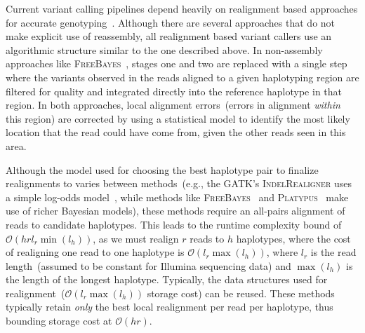 \documentclass[phd]{ucbthesis}
\begin{document}
Current variant calling pipelines depend heavily on realignment based approaches for accurate
genotyping~\cite{li14}. Although there are several approaches that do not make explicit use of reassembly,
all realignment based variant callers use an algorithmic structure similar to the one described
above. In non-assembly approaches like \textsc{FreeBayes}~\cite{garrison12}, stages
one and two are replaced with a single step where the variants observed in the reads aligned to a given
haplotyping region are filtered for quality and integrated directly into the reference haplotype in that region.
In both approaches, local alignment errors~(errors in alignment \emph{within} this region) are corrected
by using a statistical model to identify the most likely location that the read could have come from, given
the other reads seen in this area.

Although the model used for choosing the best haplotype pair to finalize realignments to varies between
methods~(e.g., the GATK's \textsc{IndelRealigner} uses a simple log-odds model~\cite{depristo11}, while
methods like \textsc{FreeBayes}~\cite{garrison12} and \textsc{Platypus}~\cite{rimmer14} make use of richer
Bayesian models), these methods require an all-pairs alignment of reads to candidate
haplotypes. This leads to the runtime complexity bound of $\mathcal{O}(h r l_r \min(l_h))$,
as we must realign $r$ reads to $h$ haplotypes, where the cost of realigning
one read to one haplotype is $\mathcal{O}(l_r \max(l_h))$, where $l_r$ is the read length~(assumed to be
constant for Illumina sequencing data) and $\max(l_h)$ is the length of the longest haplotype. Typically,
the data structures used for realignment~($\mathcal{O}(l_r \max(l_h))$ storage cost) can be reused.
These methods typically retain \emph{only} the best local realignment per read per haplotype, thus
bounding storage cost at $\mathcal{O}(h r)$.
\end{document}
